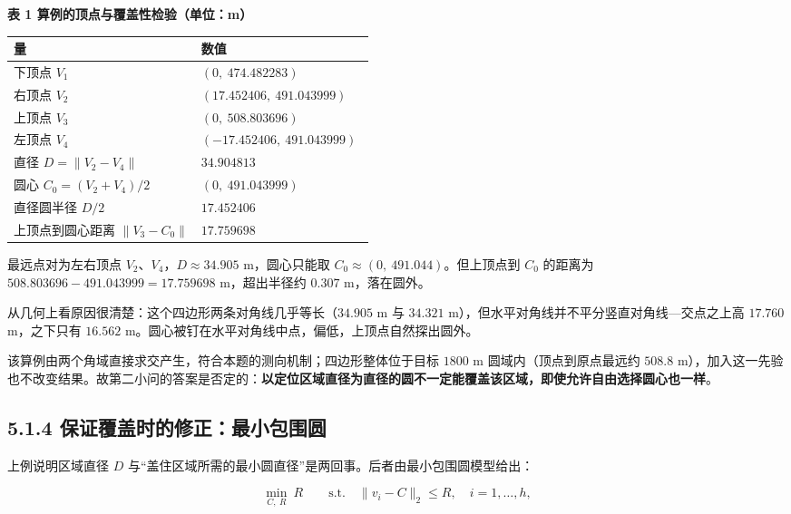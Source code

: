 \documentclass[UTF8,a4paper,zihao=-4,fontset=fandol]{ctexart}
\begin{document}
\begin{center}
\textbf{表 1 算例的顶点与覆盖性检验（单位：m）}
\end{center}

\begin{center}
\renewcommand{\arraystretch}{1.3}
\begin{tabularx}{0.98\linewidth}{>{\raggedright\arraybackslash}p{0.52\linewidth}X}
\toprule
\textbf{量} & \textbf{数值} \\
\midrule
下顶点 $V_1$ & $(0,\ 474.482283)$ \\
右顶点 $V_2$ & $(17.452406,\ 491.043999)$ \\
上顶点 $V_3$ & $(0,\ 508.803696)$ \\
左顶点 $V_4$ & $(-17.452406,\ 491.043999)$ \\
直径 $D=\|V_2-V_4\|$ & $34.904813$ \\
圆心 $C_0=(V_2+V_4)/2$ & $(0,\ 491.043999)$ \\
直径圆半径 $D/2$ & $17.452406$ \\
上顶点到圆心距离 $\|V_3-C_0\|$ & $\boldsymbol{17.759698}$ \\
\bottomrule
\end{tabularx}
\end{center}

最远点对为左右顶点 $V_2$、$V_4$，$D\approx 34.905$ m，圆心只能取 $C_0\approx(0,\ 491.044)$。但上顶点到 $C_0$ 的距离为 $508.803696-491.043999=17.759698$ m，超出半径约 $0.307$ m，落在圆外。

从几何上看原因很清楚：这个四边形两条对角线几乎等长（$34.905$ m 与 $34.321$ m），但水平对角线并不平分竖直对角线---交点之上高 $17.760$ m，之下只有 $16.562$ m。圆心被钉在水平对角线中点，偏低，上顶点自然探出圆外。

该算例由两个角域直接求交产生，符合本题的测向机制；四边形整体位于目标 $1800$ m 圆域内（顶点到原点最远约 $508.8$ m），加入这一先验也不改变结果。故第二小问的答案是否定的：\textbf{以定位区域直径为直径的圆不一定能覆盖该区域，即使允许自由选择圆心也一样}。

\subsection*{5.1.4 保证覆盖时的修正：最小包围圆}

上例说明区域直径 $D$ 与“盖住区域所需的最小圆直径”是两回事。后者由最小包围圆模型给出：

\[
\min_{C,\ R}\ R
\qquad\text{s.t.}\quad\|v_i-C\|_2\le R,\quad i=1,\dots,h, \tag{7}
\]
\end{document}
